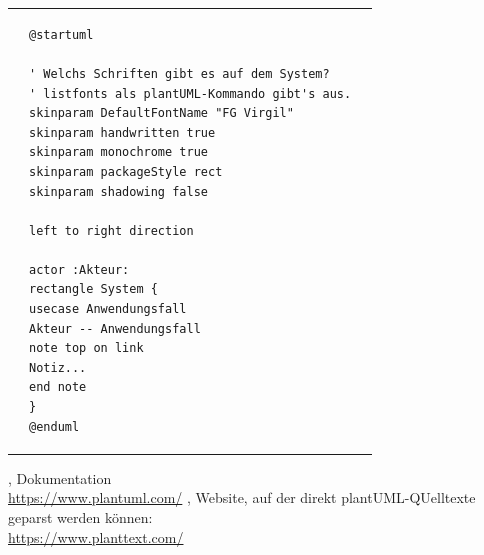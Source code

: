 \documentclass[10pt]{scrartcl}
\begin{document}
\begin{tabular}[b]{p{5.5cm} p{5.5cm} p{5.5cm}}
&


\begin{lstlisting}[style=plantuml]
@startuml

' Welchs Schriften gibt es auf dem System?
' listfonts als plantUML-Kommando gibt's aus.
skinparam DefaultFontName "FG Virgil"
skinparam handwritten true
skinparam monochrome true
skinparam packageStyle rect
skinparam shadowing false

left to right direction

actor :Akteur:
rectangle System {
usecase Anwendungsfall  
Akteur -- Anwendungsfall
note top on link
Notiz...
end note
}
@enduml
\end{lstlisting}

\end{tabular}

\begin{thebibliography}{9}
	,
	Dokumentation \\
	\url{	https://www.plantuml.com/}
	,
	Website, auf der direkt plantUML-QUelltexte geparst werden können: \\\url{https://www.planttext.com/}
\end{thebibliography}
\end{document}

